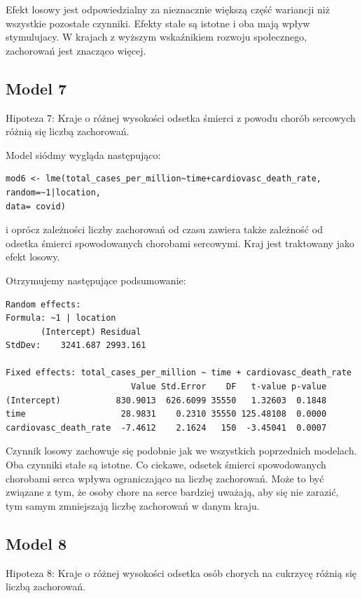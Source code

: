 \documentclass[12pt]{mwbk}
\theoremstyle{plain}
\theoremstyle{definition}
\theoremstyle{remark}
\begin{document}
Efekt losowy jest odpowiedzialny za nieznacznie większą część wariancji niż wszystkie pozostałe czynniki. Efekty stałe są istotne i oba mają wpływ stymulujacy. W krajach z wyższym wskaźnikiem rozwoju społecznego, zachorowań jest znacząco więcej.

\subsection{Model 7}

Hipoteza 7: Kraje o różnej wysokości odsetka śmierci z powodu chorób sercowych różnią się liczbą zachorowań.

Model siódmy wygląda następująco:

\begin{verbatim}
mod6 <- lme(total_cases_per_million~time+cardiovasc_death_rate,
random=~1|location,
data= covid)
\end{verbatim}

i oprócz zależności liczby zachorowań od czasu zawiera także zależność od odsetka śmierci spowodowanych chorobami sercowymi. Kraj jest traktowany jako efekt losowy.

Otrzymujemy następujące podsumowanie:
\begin{verbatim}
Random effects:
Formula: ~1 | location
       (Intercept) Residual
StdDev:    3241.687 2993.161

Fixed effects: total_cases_per_million ~ time + cardiovasc_death_rate 
                         Value Std.Error    DF   t-value p-value
(Intercept)           830.9013  626.6099 35550   1.32603  0.1848
time                   28.9831    0.2310 35550 125.48108  0.0000
cardiovasc_death_rate  -7.4612    2.1624   150  -3.45041  0.0007
\end{verbatim}

Czynnik losowy zachowuje się podobnie jak we wszystkich poprzednich modelach. Oba czynniki stałe są istotne. Co ciekawe, odsetek śmierci spowodowanych chorobami serca wpływa ograniczająco na liczbę zachorowań. Może to być związane z tym, że osoby chore na serce bardziej uważają, aby się nie zarazić, tym samym zmniejszają liczbę zachorowań w danym kraju.

\subsection{Model 8}

Hipoteza 8: Kraje o różnej wysokości odsetka osób chorych na cukrzycę różnią się liczbą zachorowań.
\end{document}
